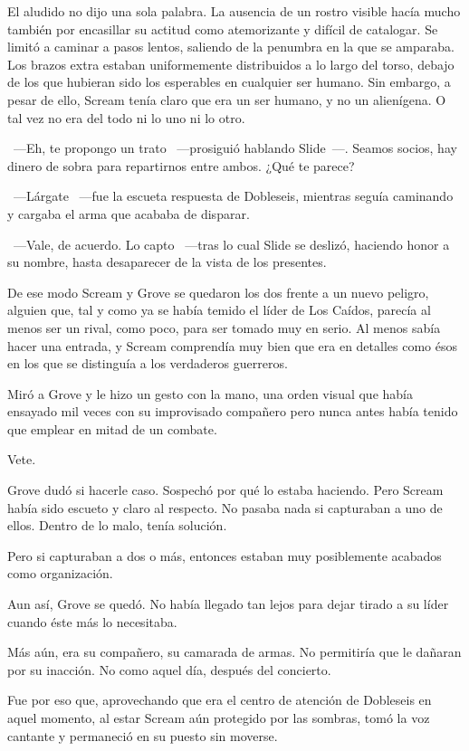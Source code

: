 El aludido no dijo una sola palabra. La ausencia de un rostro visible hacía mucho también por encasillar su actitud como atemorizante y difícil de catalogar. Se limitó a caminar a pasos lentos, saliendo de la penumbra en la que se amparaba. Los brazos extra estaban uniformemente distribuidos a lo largo del torso, debajo de los que hubieran sido los esperables en cualquier ser humano. Sin embargo, a pesar de ello, Scream tenía claro que era un ser humano, y no un alienígena. O tal vez no era del todo ni lo uno ni lo otro.

~---Eh, te propongo un trato ~---prosiguió hablando Slide~---. Seamos socios, hay dinero de sobra para repartirnos entre ambos. ¿Qué te parece?

~---Lárgate ~---fue la escueta respuesta de Dobleseis, mientras seguía caminando y cargaba el arma que acababa de disparar.

~---Vale, de acuerdo. Lo capto ~---tras lo cual Slide se deslizó, haciendo honor a su nombre, hasta desaparecer de la vista de los presentes.

De ese modo Scream y Grove se quedaron los dos frente a un nuevo peligro, alguien que, tal y como ya se había temido el líder de Los Caídos, parecía al menos ser un rival, como poco, para ser tomado muy en serio. Al menos sabía hacer una entrada, y Scream comprendía muy bien que era en detalles como ésos en los que se distinguía a los verdaderos guerreros.

Miró a Grove y le hizo un gesto con la mano, una orden visual que había ensayado mil veces con su improvisado compañero pero nunca antes había tenido que emplear en mitad de un combate.

Vete.

Grove dudó si hacerle caso. Sospechó por qué lo estaba haciendo. Pero Scream había sido escueto y claro al respecto. No pasaba nada si capturaban a uno de ellos. Dentro de lo malo, tenía solución.

Pero si capturaban a dos o más, entonces estaban muy posiblemente acabados como organización.

Aun así, Grove se quedó. No había llegado tan lejos para dejar tirado a su líder cuando éste más lo necesitaba.

Más aún, era su compañero, su camarada de armas. No permitiría que le dañaran por su inacción. No como aquel día, después del concierto.

Fue por eso que, aprovechando que era el centro de atención de Dobleseis en aquel momento, al estar Scream aún protegido por las sombras, tomó la voz cantante y permaneció en su puesto sin moverse.

